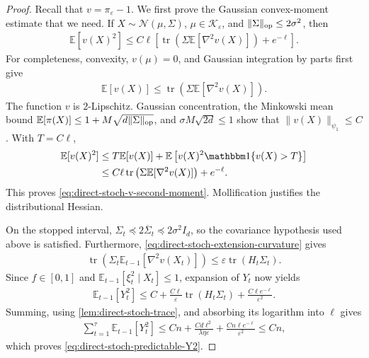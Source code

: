 \documentclass{article}
\theoremstyle{plain}
\theoremstyle{definition}
\theoremstyle{plain}
\newcommand{\tr}{\operatorname{tr}}
\newcommand{\E}{\mathbb E}
\newcommand{\cN}{\mathcal N}
\newcommand{\cK}{\mathcal K}
\begin{document}
\begin{proof}
    Recall that $v=\pi_\varepsilon-1$.  We first prove the Gaussian
    convex-moment estimate that we need.  If
    $X\sim\cN(\mu,\Sigma)$, $\mu\in\cK_\varepsilon$, and
    $\|\Sigma\|_{\rm op}\leq2\sigma^2$, then
    \begin{align}
        \E[v(X)^2]
        \leq
        C\ell\left[
        \tr\left(
        \Sigma\E[\nabla^2v(X)]
        \right)+e^{-\ell}
        \right].
        \label{eq:direct-stoch-v-second-moment}
    \end{align}
    For completeness, convexity, $v(\mu)=0$, and Gaussian integration
    by parts first give
    \begin{align}
        \E[v(X)]
        \leq
        \tr\left(\Sigma\E[\nabla^2v(X)]\right).
    \end{align}
    The function $v$ is $2$-Lipschitz.  Gaussian concentration, the
    Minkowski mean bound
    $\E[\pi(X)]\leq1+M\sqrt{d\|\Sigma\|_{\rm op}}$, and
    $\sigma M\sqrt{2d}\leq1$ show that
    $\|v(X)\|_{\psi_1}\leq C$.  With $T=C\ell$,
    \begin{align}
        \E[v(X)^2]
         & \leq
        T\E[v(X)]
        +\E\left[v(X)^2\mathbbm1\{v(X)>T\}\right]
        \\
         & \leq
        C\ell\tr\left(\Sigma\E[\nabla^2v(X)]\right)
        +e^{-\ell}.
    \end{align}
    This proves \eqref{eq:direct-stoch-v-second-moment}.  Mollification
    justifies the distributional Hessian.

    On the stopped interval,
    $\Sigma_t\preceq2\overline\Sigma_t\preceq2\sigma^2I_d$, so the
    covariance hypothesis used above is satisfied.  Furthermore,
    \eqref{eq:direct-stoch-extension-curvature} gives
    \begin{align}
        \tr\left(
        \Sigma_t\E_{t-1}[\nabla^2v(X_t)]
        \right)
        \leq\varepsilon\tr(H_t\Sigma_t).
    \end{align}
    Since $f\in[0,1]$ and
    $\E_{t-1}[\xi_t^2\mid X_t]\leq1$, expansion of $Y_t$ now yields
    \begin{align}
        \E_{t-1}[Y_t^2]
        \leq
        C+\frac{C\ell}{\varepsilon}\tr(H_t\Sigma_t)
        +\frac{C\ell e^{-\ell}}{\varepsilon^2}.
        \label{eq:direct-stoch-Y-by-trace}
    \end{align}
    Summing, using \cref{lem:direct-stoch-trace}, and absorbing its
    logarithm into $\ell$ gives
    \begin{align}
        \sum_{t=1}^{\tau}\E_{t-1}[Y_t^2]
        \leq
        Cn+\frac{Cd\ell^2}{\lambda\eta\varepsilon}
        +\frac{Cn\ell e^{-\ell}}{\varepsilon^2}
        \leq Cn,
    \end{align}
    which proves \eqref{eq:direct-stoch-predictable-Y2}.


\end{proof}
\end{document}
